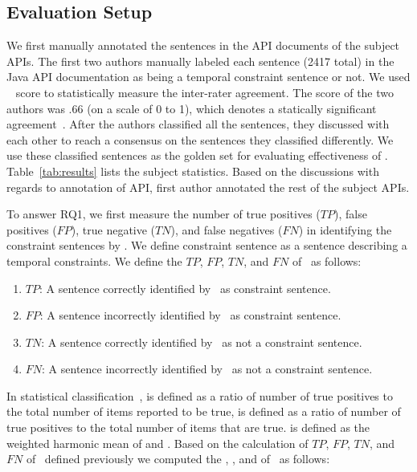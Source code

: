 \subsection{Evaluation Setup} 
We first manually annotated the sentences in the API documents of the subject APIs.
The first two authors manually labeled each sentence (2417 total) in the Java API documentation as being a temporal constraint sentence or not.
We used ~\cite{carletta1996assessing} score to statistically measure
the inter-rater agreement.
The  score of the two authors was .66 (on a scale of 0 to 1), 
which denotes a statically significant agreement~\cite{carletta1996assessing}. 
After the authors classified all the sentences, they 
discussed with each other to reach a consensus on the sentences they classified differently.
We use these classified sentences as the golden set for evaluating effectiveness of \tool.
Table~\ref{tab:results} lists the subject statistics.
Based on the discussions with regards to annotation of  API, first author annotated the rest of the subject APIs. 



To answer RQ1, we first measure the number of true positives ($TP$), false positives ($FP$), true negative ($TN$), and false negatives ($FN$)
in identifying the constraint sentences by \tool.
We define constraint sentence as a sentence describing a temporal constraints.
We define the $TP$, $FP$, $TN$, and $FN$ of \tool\ as follows:

\begin{enumerate}
	\item $TP$: A sentence correctly identified by \tool\ as constraint sentence.
	\item $FP$: A sentence incorrectly identified by \tool\ as constraint sentence.
	\item $TN$: A sentence correctly identified by \tool\ as not a constraint sentence.
	\item $FN$: A sentence incorrectly identified by \tool\ as not a constraint sentence.
\end{enumerate}


In statistical classification~\cite{Olson08},  is defined as a ratio of
number of true positives to the total number of items reported to be true,
 is defined as a ratio of number of true positives to the total number
of items that are true.  is defined as the weighted harmonic mean of 
 and .
Based on the calculation of $TP$, $FP$, $TN$, and $FN$ of \tool\ defined
previously we computed the , , and  of \tool\ as follows:


